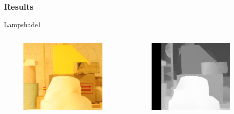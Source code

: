 \documentclass{beamer}
\begin{document}
\begin{frame}
\frametitle{Results}
Lampshade1
\begin{columns}[c] %

\begin{figure}
\includegraphics[width=0.7\linewidth]{../program/dataset/Lampshade1/view1.png}
\end{figure}

\begin{figure}
\includegraphics[width=0.7\linewidth]{../program/Result/Lampshade1.png}
\end{figure}

\end{columns}
\end{frame}

\end{document}
